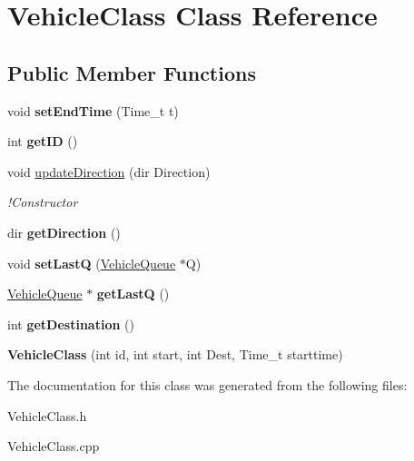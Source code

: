 \hypertarget{class_vehicle_class}{\section{Vehicle\-Class Class Reference}
\label{class_vehicle_class}
}
\subsection*{Public Member Functions}
\begin{DoxyCompactItemize}
\item 
\hypertarget{class_vehicle_class_a127372b94980fa045c648af412856fd5}{void {\bfseries set\-End\-Time} (Time\-\_\-t t)}\label{class_vehicle_class_a127372b94980fa045c648af412856fd5}

\item 
\hypertarget{class_vehicle_class_a8f00863bdcac1822d486c3d119ff1340}{int {\bfseries get\-I\-D} ()}\label{class_vehicle_class_a8f00863bdcac1822d486c3d119ff1340}

\item 
\hypertarget{class_vehicle_class_a7070e6f4e7814a6f81292a54aa3c58b5}{void \hyperlink{class_vehicle_class_a7070e6f4e7814a6f81292a54aa3c58b5}{update\-Direction} (dir Direction)}\label{class_vehicle_class_a7070e6f4e7814a6f81292a54aa3c58b5}

\begin{DoxyCompactList}\small\item\em !\-Constructor \end{DoxyCompactList}\item 
\hypertarget{class_vehicle_class_a107f9787110e3a575facf1975e40a7b2}{dir {\bfseries get\-Direction} ()}\label{class_vehicle_class_a107f9787110e3a575facf1975e40a7b2}

\item 
\hypertarget{class_vehicle_class_af0e593cd2608561e6596ae61bbc0b62f}{void {\bfseries set\-Last\-Q} (\hyperlink{class_vehicle_queue}{Vehicle\-Queue} $\ast$Q)}\label{class_vehicle_class_af0e593cd2608561e6596ae61bbc0b62f}

\item 
\hypertarget{class_vehicle_class_a2d35acee350ca16bbadd8ff048956351}{\hyperlink{class_vehicle_queue}{Vehicle\-Queue} $\ast$ {\bfseries get\-Last\-Q} ()}\label{class_vehicle_class_a2d35acee350ca16bbadd8ff048956351}

\item 
\hypertarget{class_vehicle_class_a2158372213aad34b03a4d8021e1dbd1d}{int {\bfseries get\-Destination} ()}\label{class_vehicle_class_a2158372213aad34b03a4d8021e1dbd1d}

\item 
\hypertarget{class_vehicle_class_ae4291311ac5253a754310588100c494a}{{\bfseries Vehicle\-Class} (int id, int start, int Dest, Time\-\_\-t starttime)}\label{class_vehicle_class_ae4291311ac5253a754310588100c494a}

\end{DoxyCompactItemize}


The documentation for this class was generated from the following files\-:\begin{DoxyCompactItemize}
\item 
Vehicle\-Class.\-h\item 
Vehicle\-Class.\-cpp\end{DoxyCompactItemize}
